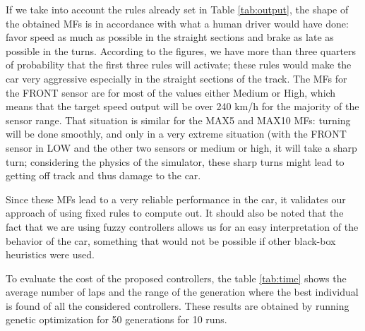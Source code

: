 \documentclass[10pt,journal,compsoc]{IEEEtran}
\begin{document}
%
If we take into account the rules already set in Table
\ref{tab:output}, the shape of the obtained MFs  is in accordance with
what a human driver would have done: favor speed as much as possible
in the straight sections and brake as late as possible in the turns. 
According to the figures, we have more than three quarters of
probability that the first three rules will activate; these rules
would make the car very aggressive especially in the straight sections
of the track. The MFs for the FRONT sensor are for most of the values
either Medium or High, which means that the target speed output will
be over 240 km/h for the majority of the sensor range. That situation
is similar for the MAX5 and MAX10 MFs: turning will be done smoothly,
and only in a very extreme situation (with the FRONT sensor in LOW and
the other two sensors or medium or high, it will take a sharp turn;
considering the physics of the simulator, these sharp turns might lead
to getting off track and thus damage to the car.

Since these MFs lead to a very reliable performance in the car, it
validates our approach of using fixed rules to compute out. It should
also be noted that the fact that we are using fuzzy controllers allows
us for an easy interpretation of the behavior of the car, something
that would not be possible if other black-box heuristics were used.

To evaluate the cost of the proposed controllers, the table \ref{tab:time} shows the average number of laps and the range of the generation where the best individual is found of all the considered controllers. These results are obtained by running genetic
optimization for 50 generations for 10 runs.  
\end{document}
